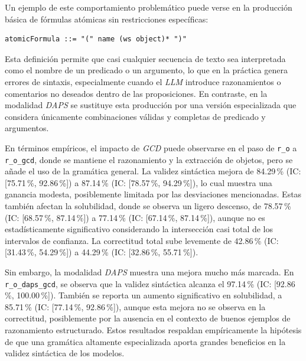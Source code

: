 Un ejemplo de este comportamiento problemático puede verse en la producción básica de fórmulas atómicas sin restricciones específicas:

\begin{verbatim}
atomicFormula ::= "(" name (ws object)* ")"
\end{verbatim}

Esta definición permite que casi cualquier secuencia de texto sea interpretada como el nombre de un predicado o un argumento, lo que en la práctica genera errores de sintaxis, especialmente cuando el \textit{LLM} introduce razonamientos o comentarios no deseados dentro de las proposiciones. En contraste, en la modalidad \textit{DAPS} se sustituye esta producción por una versión especializada que considera únicamente combinaciones válidas y completas de predicado y argumentos.

En términos empíricos, el impacto de \textit{GCD} puede observarse en el paso de \texttt{r\_o} a \texttt{r\_o\_gcd}, donde se mantiene el razonamiento y la extracción de objetos, pero se añade el uso de la gramática general. La validez sintáctica mejora de 84.29\,\% (IC: [75.71\,\%, 92.86\,\%]) a 87.14\,\% (IC: [78.57\,\%, 94.29\,\%]), lo cual muestra una ganancia modesta, posiblemente limitada por las desviaciones mencionadas. Estas también afectan la solubilidad, donde se observa un ligero descenso, de 78.57\,\% (IC: [68.57\,\%, 87.14\,\%]) a 77.14\,\% (IC: [67.14\,\%, 87.14\,\%]), aunque no es estadísticamente significativo considerando la intersección casi total de los intervalos de confianza. La correctitud total sube levemente de 42.86\,\% (IC: [31.43\,\%, 54.29\,\%]) a 44.29\,\% (IC: [32.86\,\%, 55.71\,\%]).

Sin embargo, la modalidad \textit{DAPS} muestra una mejora mucho más marcada. En \texttt{r\_o\_daps\_gcd}, se observa que la validez sintáctica alcanza el 97.14\,\% (IC: [92.86\,\%, 100.00\,\%]). También se reporta un aumento significativo en solubilidad, a 85.71\,\% (IC: [77.14\,\%, 92.86\,\%]), aunque esta mejora no se observa en la correctitud, posiblemente por la ausencia en el contexto de buenos ejemplos de razonamiento estructurado. Estos resultados respaldan empíricamente la hipótesis de que una gramática altamente especializada aporta grandes beneficios en la validez sintáctica de los modelos.


